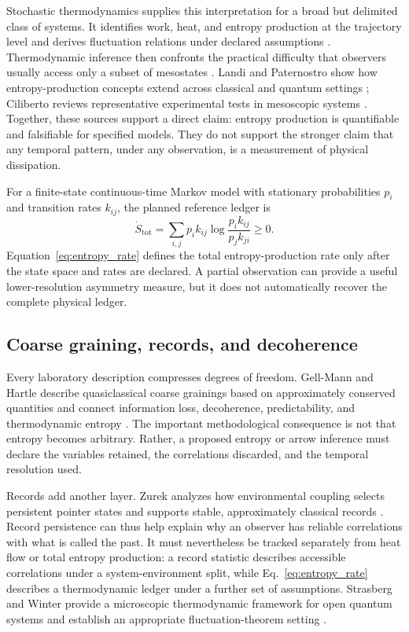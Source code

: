 \documentclass[conference]{../../../../Conference-LaTeX-template_10-17-19/IEEEtran}
\begin{document}
Stochastic thermodynamics supplies this interpretation for a broad but delimited class of systems. It identifies work, heat, and entropy production at the trajectory level and derives fluctuation relations under declared assumptions \cite{seifert2012}. Thermodynamic inference then confronts the practical difficulty that observers usually access only a subset of mesostates \cite{seifert2018}. Landi and Paternostro show how entropy-production concepts extend across classical and quantum settings \cite{landi2021}; Ciliberto reviews representative experimental tests in mesoscopic systems \cite{ciliberto2017}. Together, these sources support a direct claim: entropy production is quantifiable and falsifiable for specified models. They do not support the stronger claim that any temporal pattern, under any observation, is a measurement of physical dissipation.

For a finite-state continuous-time Markov model with stationary probabilities $p_i$ and transition rates $k_{ij}$, the planned reference ledger is
\begin{equation}
\dot{S}_{\mathrm{tot}}=\sum_{i,j}p_i k_{ij}\log\frac{p_i k_{ij}}{p_j k_{ji}}\geq 0.
\label{eq:entropy_rate}
\end{equation}
Equation~\eqref{eq:entropy_rate} defines the total entropy-production rate only after the state space and rates are declared. A partial observation can provide a useful lower-resolution asymmetry measure, but it does not automatically recover the complete physical ledger.

\subsection{Coarse graining, records, and decoherence}

Every laboratory description compresses degrees of freedom. Gell-Mann and Hartle describe quasiclassical coarse grainings based on approximately conserved quantities and connect information loss, decoherence, predictability, and thermodynamic entropy \cite{gellmann_hartle2007}. The important methodological consequence is not that entropy becomes arbitrary. Rather, a proposed entropy or arrow inference must declare the variables retained, the correlations discarded, and the temporal resolution used.

Records add another layer. Zurek analyzes how environmental coupling selects persistent pointer states and supports stable, approximately classical records \cite{zurek1993}. Record persistence can thus help explain why an observer has reliable correlations with what is called the past. It must nevertheless be tracked separately from heat flow or total entropy production: a record statistic describes accessible correlations under a system-environment split, while Eq.~\eqref{eq:entropy_rate} describes a thermodynamic ledger under a further set of assumptions. Strasberg and Winter provide a microscopic thermodynamic framework for open quantum systems and establish an appropriate fluctuation-theorem setting \cite{strasberg_winter2021}.
\end{document}
